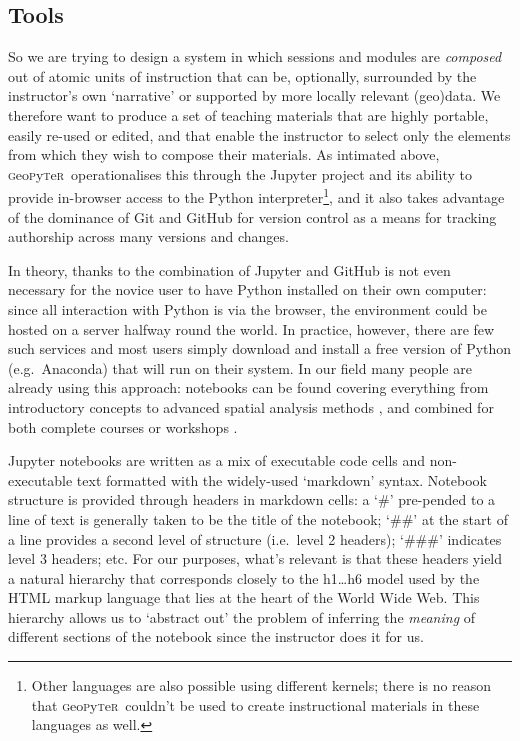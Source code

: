 \documentclass[letter, 11pt,titlepage]{article}
\newcommand{\gp}{\textsc{g}eo\textsc{p}y\textsc{t}e\textsc{r}~\/}
\newcommand{\eg}{e.g.~\/}
\newcommand{\ie}{i.e.~\/}
\begin{document}
\subsection{Tools}\label{tools}

So we are trying to design a system in which sessions and modules are
\emph{composed} out of atomic units of instruction that can be, optionally,
surrounded by the instructor's own `narrative' or supported by more locally
relevant (geo)data. We therefore want to produce a set of teaching materials
that are highly portable, easily re-used or edited, and that enable the
instructor to select only the elements from which they wish to compose their
materials. As intimated above, \gp operationalises this through the Jupyter
project and its ability to provide in-browser access to the Python
interpreter\footnote{Other languages are also possible using different kernels;
there is no reason that \gp couldn't be used to create instructional materials
in these languages as well.}, and it also takes advantage of the dominance of
Git and GitHub for version control as a means for tracking authorship across
many versions and changes.

In theory, thanks to the combination of Jupyter and GitHub is not even necessary
for the novice user to have Python installed on their own computer: since all
interaction with Python is via the browser, the environment could be hosted on a
server halfway round the world. In practice, however, there are few such
services and most users simply download and install a free version of Python
(\eg Anaconda) that will run on their system. In our field many people are
already using this approach: notebooks can be found covering everything from
introductory concepts \citep{millington_reades_2017_code} to advanced spatial
analysis methods \citep{darribas_gds15}, and combined for both complete courses
or workshops \citep{rey_2016_narsc}.

Jupyter notebooks are written as a mix of executable code cells and
non-executable text formatted with the widely-used `markdown' syntax. Notebook
structure is provided through headers in markdown cells: a `\#' pre-pended to a
line of text is generally taken to be the title of the notebook; `\#\#' at the
start of a line provides a second level of structure (\ie level 2 headers);
`\#\#\#' indicates level 3 headers; etc. For our purposes, what's relevant is
that these headers yield a natural hierarchy that corresponds closely to the
h1\ldots{}h6 model used by the HTML markup language that lies at the heart of
the World Wide Web. This hierarchy allows us to `abstract out' the problem of
inferring the \emph{meaning} of different sections of the notebook since the
instructor does it for us.
\end{document}
